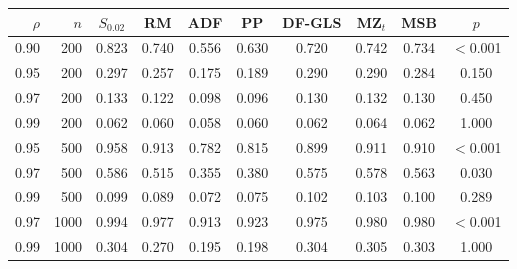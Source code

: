 \begin{tabular}{rrcccccccc}
\toprule
$\rho$ & $n$ & $S_{0.02}$ & RM & ADF & PP & DF-GLS & MZ$_t$ & MSB & $p$ \\
\midrule
0.90 & 200 & 0.823 & 0.740 & 0.556 & 0.630 & 0.720 & 0.742 & 0.734 & $<$0.001 \\
0.95 & 200 & 0.297 & 0.257 & 0.175 & 0.189 & 0.290 & 0.290 & 0.284 & 0.150 \\
0.97 & 200 & 0.133 & 0.122 & 0.098 & 0.096 & 0.130 & 0.132 & 0.130 & 0.450 \\
0.99 & 200 & 0.062 & 0.060 & 0.058 & 0.060 & 0.062 & 0.064 & 0.062 & 1.000 \\
0.95 & 500 & 0.958 & 0.913 & 0.782 & 0.815 & 0.899 & 0.911 & 0.910 & $<$0.001 \\
0.97 & 500 & 0.586 & 0.515 & 0.355 & 0.380 & 0.575 & 0.578 & 0.563 & 0.030 \\
0.99 & 500 & 0.099 & 0.089 & 0.072 & 0.075 & 0.102 & 0.103 & 0.100 & 0.289 \\
0.97 & 1000 & 0.994 & 0.977 & 0.913 & 0.923 & 0.975 & 0.980 & 0.980 & $<$0.001 \\
0.99 & 1000 & 0.304 & 0.270 & 0.195 & 0.198 & 0.304 & 0.305 & 0.303 & 1.000 \\
\bottomrule
\end{tabular}
